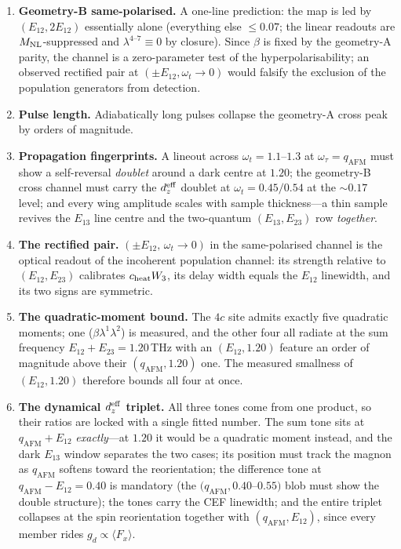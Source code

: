 \documentclass[11pt,a4paper]{article}
\newcommand{\qafm}{q_{\mathrm{AFM}}}
\newcommand{\Mnl}{M_{\rm NL}}
\begin{document}
\begin{enumerate}
  for the crystal-field wavefunctions.
\item \textbf{Geometry-B same-polarised.}  A one-line prediction: the
  map is led by $(E_{12},2E_{12})$ essentially alone (everything else
  $\leq0.07$; the linear readouts are $\Mnl$-suppressed and
  $\lambda^{4\text{--}7}\equiv0$ by closure).  Since $\beta$ is fixed by
  the geometry-A parity, the channel is a zero-parameter test of the
  hyperpolarisability; an observed rectified pair at
  $(\pm E_{12},\omega_t\!\to\!0)$ would falsify the exclusion of the
  population generators from detection.
\item \textbf{Pulse length.}  Adiabatically long pulses collapse the
  geometry-A cross peak by orders of magnitude.
\item \textbf{Propagation fingerprints.}  A lineout across
  $\omega_t=1.1$--$1.3$ at $\omega_\tau=\qafm$ must show a
  self-reversal \emph{doublet} around a dark centre at $1.20$; the
  geometry-B cross channel must carry the $d_z^{\rm eff}$ doublet at
  $\omega_t=0.45/0.54$ at the $\sim\!0.17$ level; and every wing
  amplitude scales with sample thickness---a thin sample revives the
  $E_{13}$ line centre and the two-quantum $(E_{13},E_{23})$ row
  \emph{together}.
\item \textbf{The rectified pair.}  $(\pm E_{12},\,\omega_t\to0)$ in
  the same-polarised channel is the optical readout of the incoherent
  population channel: its strength relative to $(E_{12},E_{23})$
  calibrates $c_{\rm heat}W_3$, its delay width equals the $E_{12}$
  linewidth, and its two signs are symmetric.
\item \textbf{The quadratic-moment bound.}  The $4c$ site admits
  exactly five quadratic moments; one ($\beta\lambda^1\lambda^2$) is
  measured, and the other four all radiate at the sum frequency
  $E_{12}+E_{23}=1.20$\,THz with an $(E_{12},1.20)$ feature an order of
  magnitude above their $(\qafm,1.20)$ one.  The measured smallness of
  $(E_{12},1.20)$ therefore bounds all four at once.
\item \textbf{The dynamical $d_z^{\rm eff}$ triplet.}  All three
  tones come from one product, so their ratios are locked with a
  single fitted number.  The sum tone sits at $\qafm{+}E_{12}$
  \emph{exactly}---at $1.20$ it would be a quadratic moment
  instead, and the dark $E_{13}$ window separates the two cases; its
  position must track the magnon as $\qafm$ softens toward the
  reorientation; the difference tone at $\qafm{-}E_{12}=0.40$ is
  mandatory (the $(\qafm,0.40$--$0.55)$ blob must show the double
  structure); the tones carry the CEF linewidth; and the entire
  triplet collapses at the spin reorientation together with
  $(\qafm,E_{12})$, since every member rides
  $g_d\propto\langle F_x\rangle$.
\end{enumerate}
\end{document}

